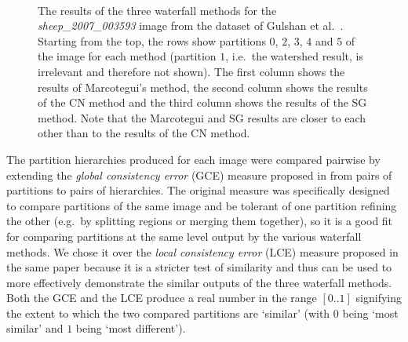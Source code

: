 \documentclass[preprint,a4paper]{elsarticle}
\newenvironment{stusubfig}[1]
{
	\begin{figure}[#1]
	\begin{center}
}
{
	\end{center}
	\end{figure}
}
\begin{document}
\begin{stusubfig}{!t}
	\\
	\hspace{4mm}%
	\hspace{4mm}%
\caption{The results of the three waterfall methods for the \emph{sheep\_2007\_003593} image from the dataset of Gulshan et al.\ \cite{gulshan10}. Starting from the top, the rows show partitions $0$, $2$, $3$, $4$ and $5$ of the image for each method (partition $1$, i.e.~the watershed result, is irrelevant and therefore not shown). The first column shows the results of Marcotegui's method, the second column shows the results of the CN method and the third column shows the results of the SG method. Note that the Marcotegui and SG results are closer to each other than to the results of the CN method.}
\label{fig:sheep}
\end{stusubfig}

The partition hierarchies produced for each image were compared pairwise by extending the \emph{global consistency error} (GCE) measure proposed in \cite{martin01} from pairs of partitions to pairs of hierarchies. The original measure was specifically designed to compare partitions of the same image and be tolerant of one partition refining the other (e.g.~by splitting regions or merging them together), so it is a good fit for comparing partitions at the same level output by the various waterfall methods. We chose it over the \emph{local consistency error} (LCE) measure proposed in the same paper because it is a stricter test of similarity and thus can be used to more effectively demonstrate the similar outputs of the three waterfall methods. Both the GCE and the LCE produce a real number in the range $[0..1]$ signifying the extent to which the two compared partitions are `similar' (with $0$ being `most similar' and $1$ being `most different').
\end{document}
